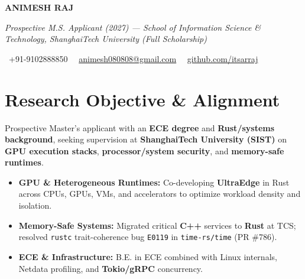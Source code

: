 \documentclass[a4paper,11pt]{article}
\newcommand{\socialicon}[1]{\raisebox{-0.05em}{\resizebox{!}{1em}{#1}}}
\newcommand{\headerfontiii}{\fontfamily{ppl}\selectfont} %
\begin{document}
\headerfontiii

\begin{center}
    {\Huge\textbf{ANIMESH RAJ}}
\end{center}
\vspace{-6mm}

\begin{center}
    {\small\textit{Prospective M.S. Applicant (2027) --- School of Information Science \& Technology, ShanghaiTech University (Full Scholarship)}}
\end{center}
\vspace{-6mm}

\begin{center}
    {\small
    \socialicon{\faPhone}\ +91-9102888850 \textbar\ 
    \socialicon{\faEnvelope}\ \href{mailto:animesh080808@gmail.com}{animesh080808@gmail.com} \textbar\ 
    \socialicon{\faGithub}\ \href{https://github.com/itsarraj}{github.com/itsarraj}
    }
\end{center}
\vspace{-4mm}

\section{\textbf{Research Objective \& Alignment}}
\vspace{1mm}
{\small
Prospective Master's applicant with an \textbf{ECE degree} and \textbf{Rust/systems background}, seeking supervision at \textbf{ShanghaiTech University (SIST)} on \textbf{GPU execution stacks}, \textbf{processor/system security}, and \textbf{memory-safe runtimes}.
\begin{itemize}[leftmargin=3ex, itemsep=0.4mm, topsep=1mm]
    \item \textbf{GPU \& Heterogeneous Runtimes:} Co-developing \textbf{UltraEdge} in Rust across CPUs, GPUs, VMs, and accelerators to optimize workload density and isolation.
    \item \textbf{Memory-Safe Systems:} Migrated critical \textbf{C++} services to \textbf{Rust} at TCS; resolved \texttt{rustc} trait-coherence bug \texttt{E0119} in \texttt{time-rs/time} (PR \#786).
    \item \textbf{ECE \& Infrastructure:} B.E. in ECE combined with Linux internals, Netdata profiling, and \textbf{Tokio/gRPC} concurrency.
\end{itemize}
}
\vspace{-3mm}
\end{document}
